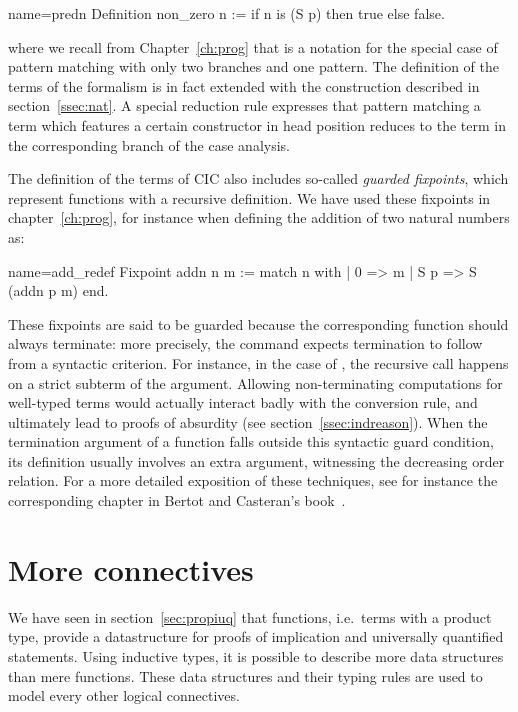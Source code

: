 \begin{coq}{name=predn}{}
Definition non_zero n := if n is (S p) then true else false.
\end{coq}
where we recall from Chapter~\ref{ch:prog} that  is a notation for the special case of pattern matching
with only two branches and one pattern. The definition of the terms of
the formalism is in fact extended with the 
construction described in section~\ref{ssec:nat}. A special reduction
rule expresses that pattern matching a term which features a certain
constructor in head position reduces to the term in the corresponding
branch of the case analysis.

The definition of the terms of CIC also includes so-called
\emph{guarded fixpoints}, which represent functions with a recursive
definition. We have used these fixpoints in chapter~\ref{ch:prog}, for
instance when defining the addition of two natural numbers as:

\begin{coq}{name=add_redef}{}
Fixpoint addn n m :=
  match n with
  | 0 => m
  | S p => S (addn p m)
  end.
\end{coq}
These fixpoints are said to be guarded because the corresponding
function should always terminate: more precisely, the 
command expects termination to follow from a syntactic
criterion. For instance, in the case of , the recursive call
happens on a strict subterm of the argument. Allowing
non-terminating computations for well-typed terms would actually
interact badly with the conversion rule, and ultimately lead to proofs
of absurdity (see section~\ref{ssec:indreason}). When the termination
argument of a function falls outside this syntactic guard condition,
its definition usually involves an extra argument, witnessing the
decreasing order relation. For a more detailed exposition of these
techniques, see for instance the corresponding chapter in Bertot and
Casteran's book~\cite[Chapter 14]{BC04}.




\section{More connectives}\label{sec:moreconns}
We have seen in section~\ref{sec:propiuq} that functions, i.e.~terms
with a product type, provide a datastructure for proofs of implication
and universally quantified statements.
Using inductive types, it is possible to describe more data
structures than mere functions. %
These data structures and their
typing rules are used to model every other logical connectives.

